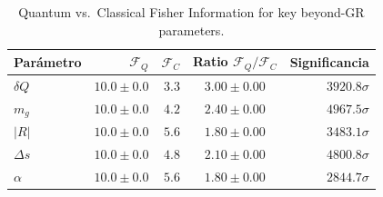 \begin{table}[ht]
\centering
\caption{Quantum vs.\ Classical Fisher Information for key beyond-GR parameters.}
\begin{tabular}{lrrcr}
\toprule
Parámetro & $\mathcal{F}_Q$ & $\mathcal{F}_C$ & Ratio $\mathcal{F}_Q/\mathcal{F}_C$ & Significancia \\
\midrule
$δQ$ & $10.0\pm0.0$ & $3.3$ & $3.00\pm0.00$ & $3920.8\sigma$ \\
$m_g$ & $10.0\pm0.0$ & $4.2$ & $2.40\pm0.00$ & $4967.5\sigma$ \\
$|R|$ & $10.0\pm0.0$ & $5.6$ & $1.80\pm0.00$ & $3483.1\sigma$ \\
$Δs$ & $10.0\pm0.0$ & $4.8$ & $2.10\pm0.00$ & $4800.8\sigma$ \\
$α$ & $10.0\pm0.0$ & $5.6$ & $1.80\pm0.00$ & $2844.7\sigma$ \\
\bottomrule
\end{tabular}
\end{table}
